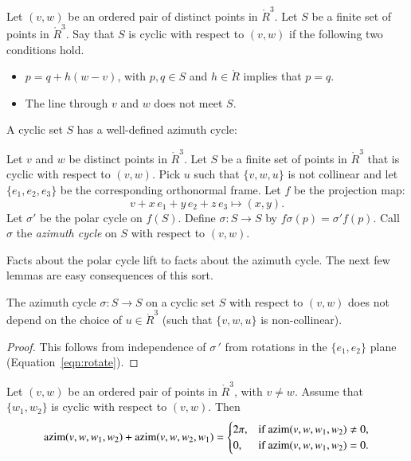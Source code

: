 \begin{definition} Let $(v,w)$ be an ordered pair of distinct points in
$\ring{R}^3$.
Let $S$ be a finite set of points in $\ring{R}^3$.
Say that $S$ is cyclic with respect to $(v,w)$ if
the following two conditions hold.
\begin{itemize}
\item $p = q + h (w-v)$, with $p,q\in S$ and $h\in \ring{R}$
implies that $p=q$.  
\item  The line through $v$ and $w$ does not meet $S$.
\end{itemize}
\end{definition}

A cyclic set $S$ has a well-defined azimuth cycle:

\begin{definition}
Let $v$ and $w$ be distinct points in
$\ring{R}^3$.
Let $S$ be a finite set of points in $\ring{R}^3$ that is
cyclic  with respect to $(v,w)$.  Pick $u$ such that $\{v,w,u\}$ is not collinear and let $\{e_1,e_2,e_3\}$ be the corresponding orthonormal frame.
Let $f$ be the projection map:
   $$v + x\, e_1 + y\, e_2 + z\, e_3 \mapsto
     (x,y).$$
Let $\sigma'$ be the polar cycle on $f(S)$. Define 
$\sigma:S\to S$ by $f\sigma(p) =\sigma'f(p)$.
Call $\sigma$ the {\it azimuth cycle}
on $S$ with respect to $(v,w)$.
\end{definition}

Facts about the polar cycle lift to facts about the azimuth cycle.
The next few lemmas are easy consequences of this sort.


\begin{lemma} The azimuth cycle $\sigma:S\to S$ on
a cyclic set $S$ with respect to $(v,w)$ does not depend
on the choice of $u\in\ring{R}^3$ (such that $\{v,w,u\}$ is non-collinear).
\end{lemma}

\begin{proof} This follows from independence of $\sigma\,'$ from
rotations in the $\{e_1,e_2\}$ plane  (Equation~\ref{eqn:rotate}).
\end{proof}


\begin{lemma} 
Let $(v,w)$ be an ordered pair of points in $\ring{R}^3$,
with $v\ne w$.  Assume that $\{w_1,w_2\}$ is cyclic
with respect to $(v,w)$.  Then
  $$
  {\operatorname{azim}}(v,w,w_1,w_2) + {\operatorname{azim}}(v,w,w_2,w_1) 
  = \begin{cases} 2\pi, & \text{if }{\operatorname{azim}}(v,w,w_1,w_2)\ne 0,\\
    0, & \text{if }{\operatorname{azim}}(v,w,w_1,w_2)=0.
    \end{cases}
    $$
\end{lemma}

